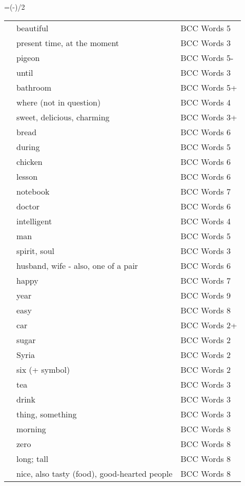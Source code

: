 \documentclass[10pt]{article}
\makeatletter
\newenvironment{indextable}{
\newbox\myb
\setbox\myb\vbox\bgroup\hsize=\dimexpr(\textwidth-\columnsep)/2\relax
\makeatletter
\chardef\LT@end@pen\z@
\makeatother
\begin{longtable}{p{0.1\textwidth}p{0.2\textwidth}>{\scriptsize}p{0.2\textwidth}}
}{
\end{longtable}\egroup
\setlength{\columnseprule}{0.4pt}
\begin{multicols*}{2}
\unvbox\myb
\end{multicols*}
}
\makeatother
\begin{document}
\begin{indextable}
\ta{جَميل،جَميلة} & beautiful & BCC Words 5 \\
\ta{حالي} & present time, at the moment & BCC Words 3 \\
\ta{حمام} & pigeon & BCC Words 5- \\
\ta{حَتَّى} & until & BCC Words 3 \\
\ta{حَمَّام،حَمَّامَات} & bathroom & BCC Words 5+ \\
\ta{حَيْثُ} & where (not in question) & BCC Words 4 \\
\ta{حُلْو،حُلْوَة} & sweet, delicious, charming & BCC Words 3+ \\
\ta{خُبْز} & bread & BCC Words 6 \\
\ta{خِلال} & during & BCC Words 5 \\
\ta{دَجاج} & chicken & BCC Words 6 \\
\ta{دَرْس} & lesson & BCC Words 6 \\
\ta{دَفْتَر،دَفاتِر} & notebook & BCC Words 7 \\
\ta{دُكْتور،دُكْتورة} & doctor & BCC Words 6 \\
\ta{ذَكي،أَذْكياء} & intelligent & BCC Words 4 \\
\ta{رَجُل،رِجال} & man & BCC Words 5 \\
\ta{رُوح،أَرْواح} & spirit, soul & BCC Words 3 \\
\ta{زَوْج،زَوْجة} & husband, wife - also, one of a pair & BCC Words 6 \\
\ta{سَعيد،سَعيدة} & happy & BCC Words 7 \\
\ta{سَنَة،سَنَوات} & year & BCC Words 9 \\
\ta{سَهْل،سَهْلة} & easy & BCC Words 8 \\
\ta{سَيَّارَة،سَيَّارَات} & car & BCC Words 2+ \\
\ta{سُكَّر} & sugar & BCC Words 2 \\
\ta{سُوريا} & Syria & BCC Words 2 \\
\ta{سِتَّة،٦} & six (+ symbol) & BCC Words 2 \\
\ta{شاي} & tea & BCC Words 3 \\
\ta{شَراب} & drink & BCC Words 3 \\
\ta{شَيْء،أَشْياء} & thing, something & BCC Words 3 \\
\ta{صَباح} & morning & BCC Words 8 \\
\ta{صِفْر،۰} & zero & BCC Words 8 \\
\ta{طَويل،طَويلة} & long; tall & BCC Words 8 \\
\ta{طَيِّب,طَيِّبَة} & nice, also tasty (food), good-hearted people & BCC Words 8 \\

\end{indextable}
\end{document}
